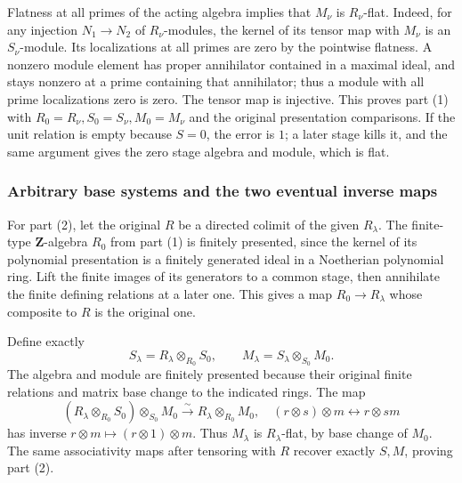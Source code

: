 Flatness at all primes of the acting algebra implies that \(M_\nu\) is \(R_\nu\)-flat. Indeed, for any injection \(N_1\to N_2\) of \(R_\nu\)-modules, the kernel of its tensor map with \(M_\nu\) is an \(S_\nu\)-module. Its localizations at all primes are zero by the pointwise flatness. A nonzero module element has proper annihilator contained in a maximal ideal, and stays nonzero at a prime containing that annihilator; thus a module with all prime localizations zero is zero. The tensor map is injective. This proves part (1) with \(R_0=R_\nu,S_0=S_\nu,M_0=M_\nu\) and the original presentation comparisons. If the unit relation is empty because \(S=0\), the error is \(1\); a later stage kills it, and the same argument gives the zero stage algebra and module, which is flat.

\subsubsection{Arbitrary base systems and the two eventual inverse maps}\label{algebra-proof-072-arbitrary-base-systems-and-the-two-eventual-inverse-maps}

For part (2), let the original \(R\) be a directed colimit of the given \(R_\lambda\). The finite-type \(\mathbf Z\)-algebra \(R_0\) from part (1) is finitely presented, since the kernel of its polynomial presentation is a finitely generated ideal in a Noetherian polynomial ring. Lift the finite images of its generators to a common stage, then annihilate the finite defining relations at a later one. This gives a map \(R_0\to R_\lambda\) whose composite to \(R\) is the original one.

Define exactly \[
 S_\lambda=R_\lambda\otimes_{R_0}S_0,
 \qquad M_\lambda=S_\lambda\otimes_{S_0}M_0.
\] The algebra and module are finitely presented because their original finite relations and matrix base change to the indicated rings. The map \[
 (R_\lambda\otimes_{R_0}S_0)\otimes_{S_0}M_0
    \xrightarrow{\sim}R_\lambda\otimes_{R_0}M_0,
 \quad(r\otimes s)\otimes m\longleftrightarrow r\otimes sm
\] has inverse \(r\otimes m\mapsto(r\otimes1)\otimes m\). Thus \(M_\lambda\) is \(R_\lambda\)-flat, by base change of \(M_0\). The same associativity maps after tensoring with \(R\) recover exactly \(S,M\), proving part (2).


